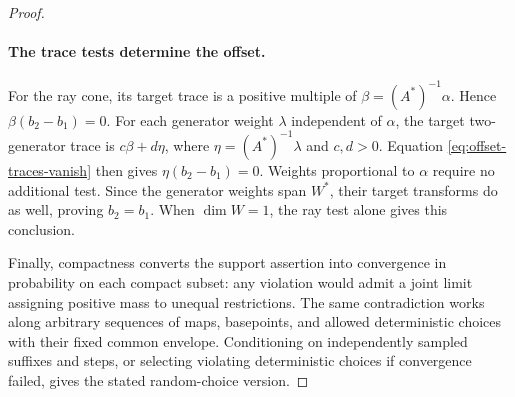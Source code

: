 \begin{proof}
\paragraph{The trace tests determine the offset.}
For the ray cone, its target trace is a positive multiple of
$\beta=(A^*)^{-1}\alpha$.  Hence $\beta(b_2-b_1)=0$.
For each generator weight $\lambda$ independent of $\alpha$, the target
two-generator trace is $c\beta+d\eta$, where
$\eta=(A^*)^{-1}\lambda$ and $c,d>0$.  Equation
\eqref{eq:offset-traces-vanish} then gives $\eta(b_2-b_1)=0$.
Weights proportional to $\alpha$ require no additional test.  Since the
generator weights span $W^*$, their target transforms do as well, proving
$b_2=b_1$.  When $\dim W=1$, the ray test alone gives this conclusion.

Finally, compactness converts the support assertion into convergence in
probability on each compact subset: any violation would admit a joint
limit assigning positive mass to unequal restrictions.  The same
contradiction works along arbitrary sequences of maps, basepoints, and
allowed deterministic choices with their fixed common envelope.
Conditioning on independently sampled suffixes and steps, or selecting
violating deterministic choices if convergence failed, gives the stated
random-choice version.
\end{proof}
